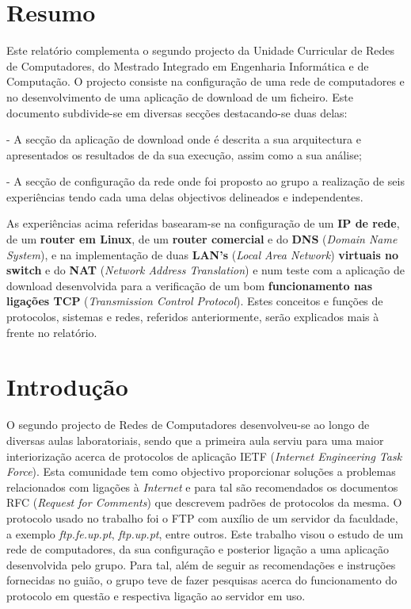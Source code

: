 \documentclass[a4paper]{article}
\begin{document}

\newpage

\section*{Resumo}
Este relatório complementa o segundo projecto da Unidade Curricular de Redes de Computadores, do Mestrado Integrado em Engenharia Informática e de Computação. O projecto consiste na configuração de uma rede de computadores e no desenvolvimento de uma aplicação de download de um ficheiro.
Este documento subdivide-se em diversas secções destacando-se duas delas:

- A secção da aplicação de download onde é descrita a sua arquitectura e apresentados os resultados de da sua execução, assim como a sua análise; 

- A secção de configuração da rede onde foi proposto ao grupo a realização de seis experiências tendo cada uma delas objectivos delineados e independentes.\linebreak

As experiências acima referidas basearam-se na configuração de um \textbf{IP de rede}, de um \textbf{router em Linux}, de um \textbf{router comercial} e do \textbf{DNS} (\textit{Domain Name System}), e na implementação de duas \textbf{LAN's} (\textit{Local Area Network}) \textbf{virtuais no switch} e do \textbf{NAT} (\textit{Network Address Translation}) e num teste com a aplicação de download desenvolvida para a verificação de um bom \textbf{funcionamento nas ligações TCP} (\textit{Transmission Control Protocol}). Estes conceitos e funções de protocolos, sistemas e redes, referidos anteriormente, serão explicados mais à frente no relatório.

\newpage

\tableofcontents
\newpage

\section{Introdução}
O segundo projecto de Redes de Computadores desenvolveu-se ao longo de diversas aulas laboratoriais, sendo que a primeira aula serviu para uma maior interiorização acerca de protocolos de aplicação IETF (\textit{Internet Engineering Task Force}). Esta comunidade tem como objectivo proporcionar soluções a problemas relacionados com ligações à \textit{Internet} e para tal são recomendados os documentos RFC (\textit{Request for Comments}) que descrevem padrões de protocolos da mesma.
O protocolo usado no trabalho foi o FTP com auxílio de um servidor da faculdade, a exemplo \textit{ftp.fe.up.pt}, \textit{ftp.up.pt}, entre outros.
Este trabalho visou o estudo de um rede de computadores, da sua configuração e posterior ligação a uma aplicação desenvolvida pelo grupo. Para tal, além de seguir as recomendações e instruções fornecidas no guião, o grupo teve de fazer pesquisas acerca do funcionamento do protocolo em questão e respectiva ligação ao servidor em uso.
\end{document}
